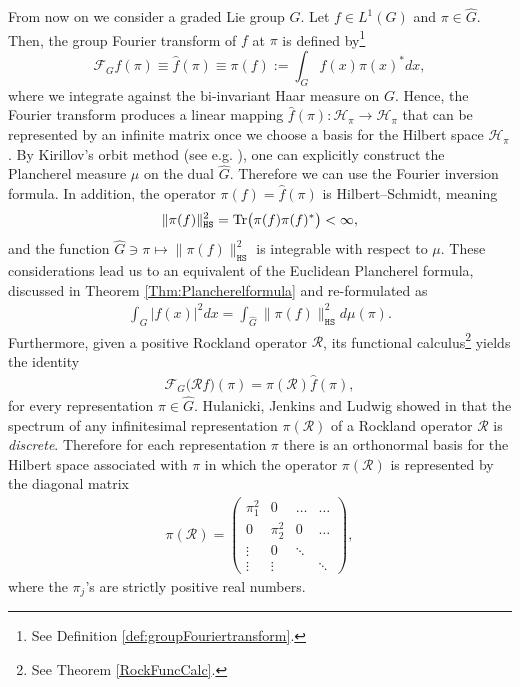 \documentclass[12pt,oneside,a4paper]{book}
\numberwithin{equation}{section}     %
\theoremstyle{plain}
\theoremstyle{definition}
\newcommand{\HS}{{\mathtt{HS}}}
\begin{document}
From now on we consider a graded Lie group $G$. Let $f\in L^1(G)$ and $\pi\in\widehat G$. Then, the group Fourier transform of $f$ at $\pi$ is defined by\footnote{See Definition \ref{def:groupFouriertransform}.}
\[
\mathcal F_G f(\pi)\equiv\widehat f(\pi)\equiv\pi(f):=\int_G f(x)\pi(x)^*dx,
\] 
where we integrate against the bi-invariant Haar measure on $G$.
Hence, the Fourier transform produces a linear mapping $\widehat f(\pi):\mathcal H_\pi\rightarrow\mathcal H_\pi$ that can be represented by an infinite matrix  once we choose a basis for the Hilbert space $\mathcal H_\pi$. By Kirillov's orbit method (see e.g. \cite{CG90}), one can explicitly construct the Plancherel measure $\mu$ on the dual $\widehat G$. Therefore we can use the Fourier inversion formula. In addition,  the operator $\pi(f)=\widehat f (\pi)$ is Hilbert--Schmidt, meaning
\begin{align*}
\|\pi(f)\|^2_{\HS}={\rm Tr}\big(\pi(f)\pi(f)^*\big)<\infty,
\end{align*}
and the function $\widehat G\ni\pi \mapsto \|\pi(f)\|^2_{\HS}$ is integrable with respect to $\mu$. These considerations lead us to an equivalent of the Euclidean Plancherel formula, discussed in Theorem \ref{Thm:Plancherelformula} and re-formulated as
\begin{align}\label{plancherel}
\int_G|f(x)|^2dx=\int_{\widehat G}\|\pi(f)\|^2_{\HS}d\mu(\pi).
\end{align}
Furthermore, given a positive Rockland operator $\mathcal{R}$, its functional calculus\footnote{See Theorem \ref{RockFuncCalc}.} yields the identity
\begin{align*}
\mathcal F_G \big(\mathcal R f\big)(\pi)=\pi({\mathcal R})\widehat f(\pi),
\end{align*}
for every representation $\pi\in\widehat{G}$. Hulanicki, Jenkins and Ludwig showed in \cite{HJL1985} that the spectrum of any infinitesimal representation $\pi(\mathcal R)$ of a Rockland operator $\mathcal{R}$ is \textit{discrete}. Therefore for each representation $\pi$ there is an orthonormal basis for the Hilbert space associated with $\pi$ in which the operator $\pi(\mathcal{R})$ is represented by the diagonal matrix
\begin{align}\label{eq:symbRock1}
\pi(\mathcal R)=\begin{pmatrix}
\pi^2_1 & 0      & \dots    & \dots \\
0      & \pi^2_2 & 0    & \dots \\
\vdots&   0       & \ddots  &          \\
\vdots& \vdots  &             & \ddots
\end{pmatrix},
\end{align}
where the $\pi_j$'s are strictly positive real numbers. 
\end{document}
